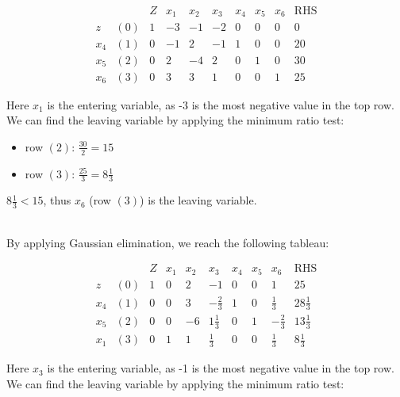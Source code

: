 \documentclass[12pt]{article}
\begin{document}
\begin{equation*}
  \begin{array}{cc|r|rrrrrr|c}
            &     & Z & x_1 & x_2 & x_3 & x_4 & x_5 & x_6 & \text{RHS} \\ \hline
        z   & (0) & 1 &  -3 &  -1 &  -2 &   0 &   0 &   0 & 0 \\
        x_4 & (1) & 0 &  -1 &   2 &  -1 &   1 &   0 &   0 & 20 \\
        x_5 & (2) & 0 &   2 &  -4 &   2 &   0 &   1 &   0 & 30 \\
        x_6 & (3) & 0 &   3 &   3 &   1 &   0 &   0 &   1 & 25
  \end{array}
\end{equation*}

\noindent
Here $x_1$ is the entering variable, as -3 is the most negative value in the top row.
We can find the leaving variable by applying the minimum ratio test:

\begin{itemize}
  \item row $(2)$: $\frac{30}{2} = 15$
  \item row $(3)$: $\frac{25}{3} = 8\frac{1}{3}$
\end{itemize}

\noindent
$8\frac{1}{3} < 15$, thus $x_6$ (row $(3)$) is the leaving variable.

\noindent
\\
By applying Gaussian elimination, we reach the following tableau:

\begin{equation*}
  \begin{array}{cc|r|rrrrrr|c}
            &     & Z & x_1 & x_2 &           x_3 & x_4 & x_5 &           x_6 & \text{RHS} \\ \hline
        z   & (0) & 1 &   0 &   2 &            -1 &   0 &   0 &             1 & 25 \\
        x_4 & (1) & 0 &   0 &   3 &  -\frac{2}{3} &   1 &   0 &   \frac{1}{3} & 28\frac{1}{3} \\
        x_5 & (2) & 0 &   0 &  -6 &  1\frac{1}{3} &   0 &   1 &  -\frac{2}{3} & 13\frac{1}{3} \\
        x_1 & (3) & 0 &   1 &   1 &   \frac{1}{3} &   0 &   0 &   \frac{1}{3} & 8\frac{1}{3}
  \end{array}
\end{equation*}

\noindent
Here $x_3$ is the entering variable, as -1 is the most negative value in the top row.
We can find the leaving variable by applying the minimum ratio test:
\end{document}
